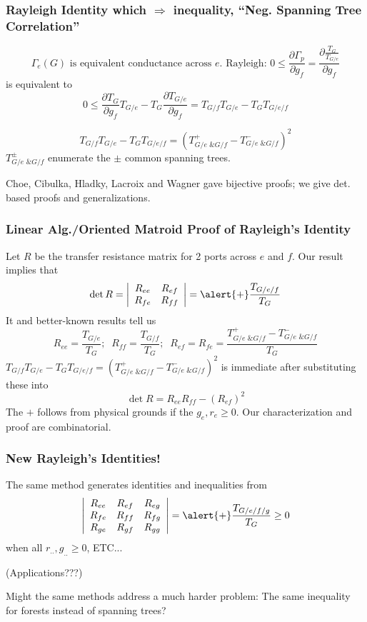 \documentclass{beamer}
\newcommand{\Remph}[1]{{\color{red}#1}}
\begin{document}
\begin{frame}
\frametitle{Rayleigh Identity which $\Rightarrow$ inequality, 
``Neg. Spanning Tree Correlation''}
\[
\Gamma_e(G)\text{ is equivalent conductance across }e.
\text{ Rayleigh: }0 \le \frac{\partial \Gamma_{p}}{\partial g_f} =
\frac{\partial \frac{T_G}{T_{G/e}}}{\partial g_f}
\]
is equivalent to 
\[
0 \le \frac{\partial T_G}{\partial g_f}T_{G/e} - 
       T_G\frac{\partial T_{G/e}}{\partial g_f} 
=
T_{G/f}T_{G/e} - T_GT_{G/e/f}
\]
\begin{theorem}
\[
T_{G/f}T_{G/e} - T_GT_{G/e/f} = \left( T^+_{G/e \text{ \& } G/f} - T^-_{G/e \text{ \& } G/f} \right)^2
\]
$T^{\pm}_{G/e \text{ \& } G/f}$ enumerate the $\pm$ common spanning trees.
\end{theorem}
Choe, Cibulka, Hladky, Lacroix and Wagner gave bijective proofs; 
we give det. based proofs and generalizations.
\end{frame}



\begin{frame}
\frametitle{Linear Alg./Oriented Matroid Proof of Rayleigh's Identity}
Let $R$ be the transfer resistance matrix for 2 ports across $e$ and $f$.
Our result implies that
\[
\det R = \left|\begin{array}{cc} R_{ee} & R_{ef} \\ R_{fe} & R_{ff} \end{array}\right|
= \alert{+} \frac{T_{G/e/f}}{T_G}
\]
It and better-known results tell us
\[
R_{ee} = \frac{T_{G/e}}{T_G};\;\;R_{ff} = \frac{T_{G/f}}{T_G};\;\;
R_{ef}=R_{fe}=\frac{ T^+_{G/e \text{ \& } G/f} - T^-_{G/e \text{ \& } G/f} }{T_G}
\]
$T_{G/f}T_{G/e} - T_GT_{G/e/f} = \left( T^+_{G/e \text{ \& } G/f} - T^-_{G/e \text{ \& } G/f} \right)^2$
is immediate after substituting these into
\[
\det R = R_{ee}R_{ff}-(R_{ef})^2
\]
\alert{The $+$ follows from physical grounds if the $g_e, r_e \geq 0$.  Our
characterization and proof are combinatorial.}
\end{frame}

\begin{frame}
\frametitle{New Rayleigh's Identities!}

The same method generates identities and inequalities from
\[
\left|
\begin{array}{ccc} R_{ee} & R_{ef} & R_{eg} \\ 
                   R_{fe} & R_{ff} & R_{fg} \\
                   R_{ge} & R_{gf} & R_{gg}
\end{array}\right|
= \alert{+} \frac{T_{G/e/f/g}}{T_G} \ge 0
\]
when all $r_{..}, g_{..} \ge 0$, ETC...

\vfill

(Applications???)

\vfill

\Remph{Might the same methods address a much harder problem:
The same inequality for } forests \Remph{ instead of 
spanning trees?}

\vfill
\end{frame}
\end{document}
